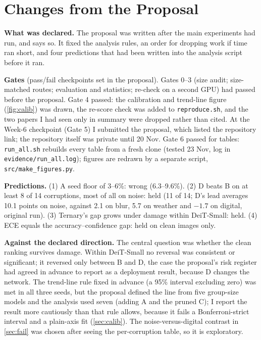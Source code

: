 \documentclass[10pt,twocolumn,letterpaper]{article}
\begin{document}
\section{Changes from the Proposal}
\label{sec:changes}
\textbf{What was declared.} The proposal was written after the main experiments had run, and says so. It fixed the analysis rules, an order for dropping work if time ran short, and four predictions that had been written into the analysis script before it ran.

\textbf{Gates} (pass/fail checkpoints set in the proposal). Gates 0--3 (size audit; size-matched routes; evaluation and statistics; re-check on a second GPU) had passed before the proposal. Gate 4 passed: the calibration and trend-line figure (\cref{fig:calib}) was drawn, the re-score check was added to \texttt{reproduce.sh}, and the two papers I had seen only in summary were dropped rather than cited. At the Week-6 checkpoint (Gate 5) I submitted the proposal, which listed the repository link; the repository itself was private until 20 Nov. Gate 6 passed for tables: \texttt{run\_all.sh} rebuilds every table from a fresh clone (tested 23 Nov, log in \texttt{evidence/run\_all.log}); figures are redrawn by a separate script, \texttt{src/make\_figures.py}.

\textbf{Predictions.} (1) A seed floor of 3--6\%: wrong (6.3--9.6\%). (2) D beats B on at least 8 of 14 corruptions, most of all on noise: held (11 of 14; D's lead averages 10.1 points on noise, against 2.1 on blur, 5.7 on weather and $-1.7$ on digital, original run). (3) Ternary's gap grows under damage within DeiT-Small: held. (4) ECE equals the accuracy--confidence gap: held on clean images only.

\textbf{Against the declared direction.} The central question was whether the clean ranking survives damage. Within DeiT-Small no reversal was consistent or significant; it reversed only between B and D, the case the proposal's risk register had agreed in advance to report as a deployment result, because D changes the network. The trend-line rule fixed in advance (a 95\% interval excluding zero) was met in all three seeds, but the proposal defined the line from five group-size models and the analysis used seven (adding A and the pruned C); I report the result more cautiously than that rule allows, because it fails a Bonferroni-strict interval and a plain-axis fit (\cref{sec:calib}). The noise-versus-digital contrast in \cref{sec:fail} was chosen after seeing the per-corruption table, so it is exploratory.
\end{document}
